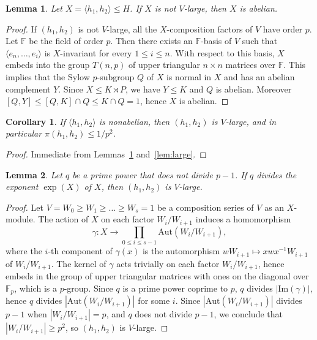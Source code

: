 \documentclass{amsart}
\newtheorem{lemma}{Lemma}
\newtheorem{corollary}{Corollary}
\begin{document}
	\begin{lemma}\label{lem:abelian}
		Let $X=\langle h_1,h_2\rangle \leq H$. If $X$ is not $V$-large, then 
		$X$ is abelian.
	\end{lemma}
	\begin{proof}
		If $(h_1,h_2)$ is not $V$-large, all the $X$-composition 
		factors of $V$ have order $p$. Let $\mathbb{F}$ be the field 
		of order $p$. Then there exists an $\mathbb{F}$-basis of $V$ 
		such that $\langle e_n,\dots,e_i\rangle$ is $X$-invariant for 
		every $1 \leq i \leq n$. With respect to this basis, $X$ 
		embeds into the group $T(n,p)$ of upper triangular $n\times n$ 
		matrices over $\mathbb{F}$. This implies that the Sylow 
		$p$-subgroup $Q$ of $X$ is normal in $X$ and has an abelian 
		complement $Y$. Since $X \leq K \rtimes P$, we have $Y \leq K$ 
		and $Q$ is abelian. Moreover 
		$[Q,Y] \leq [Q,K] \cap Q \leq K \cap Q = 1$, hence $X$ 
		is abelian.
	\end{proof}
	
	\begin{corollary}\label{cor:nonabelian}
		If $\langle h_1,h_2\rangle$ is nonabelian, then 
		$(h_1,h_2)$ is $V$-large, and in particular 
		$\pi(h_1,h_2) \leq 1/p^2$.
	\end{corollary}
	\begin{proof}
		Immediate from Lemmas~\ref{lem:abelian} and~\ref{lem:large}.
	\end{proof}
	
	
	\begin{lemma}\label{lem:q-large}
		Let $q$ be a prime power that does not divide $p-1$. If $q$ 
		divides the exponent $\exp(X)$ of $X$, then $(h_1, h_2)$ is $V$-large.
	\end{lemma}
	\begin{proof}
		Let $V = W_0 \geq W_1 \geq \dots \geq W_s = 1$ be a composition 
		series of $V$ as an $X$-module. The action of $X$ on each factor 
		$W_i/W_{i+1}$ induces a homomorphism
		$$\gamma \colon X \to \prod_{0 \leq i \leq s-1} \mathrm{Aut}(W_i/W_{i+1}),$$
		where the $i$-th component of $\gamma(x)$ is the automorphism 
		$wW_{i+1} \mapsto xwx^{-1}W_{i+1}$ of $W_i/W_{i+1}$.
		The kernel of $\gamma$ acts trivially on each factor 
		$W_i/W_{i+1}$, hence embeds in the group of upper triangular 
		matrices with ones on the diagonal over $\mathbb{F}_p$, which 
		is a $p$-group. Since $q$ is a prime power coprime to $p$, 
		$q$ divides $|\mathrm{Im}(\gamma)|$, hence $q$ divides 
		$|\mathrm{Aut}(W_i/W_{i+1})|$ for some $i$. Since 
		$|\mathrm{Aut}(W_i/W_{i+1})|$ divides $p-1$ when 
		$|W_i/W_{i+1}| = p$, and $q$ does not divide $p-1$, we 
		conclude that $|W_i/W_{i+1}| \geq p^2$, so $(h_1,h_2)$ 
		is $V$-large.
	\end{proof}
	
\end{document}
